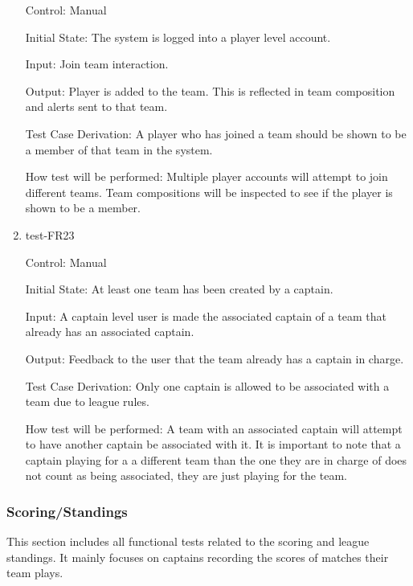 \documentclass[12pt, titlepage]{article}
\begin{document}
\begin{enumerate}
  Control: Manual

  Initial State: The system is logged into a player level account.
            
  Input: Join team interaction.
            
  Output: Player is added to the team. This is reflected in team composition
  and alerts sent to that team.

  Test Case Derivation: A player who has joined a team should be shown to be a
  member of that team in the system.

  How test will be performed: Multiple player accounts will attempt to join 
  different teams. Team compositions will be inspected to see if the player
  is shown to be a member. 

  \item{test-FR23\\}

  Control: Manual
            
  Initial State: At least one team has been created by a captain.

  Input: A captain level user is made the associated captain of a team that
  already has an associated captain.

  Output: Feedback to the user that the team already has a captain in charge.

  Test Case Derivation: Only one captain is allowed to be associated with a
  team due to league rules.

  How test will be performed: A team with an associated captain will attempt
  to have another captain be associated with it. It is important to note that
  a captain playing for a a different team than the one they are in charge of
  does not count as being associated, they are just playing for the team.

\end{enumerate}

\subsubsection{Scoring/Standings}

This section includes all functional tests related to the scoring and
league standings. It mainly focuses on captains recording the scores of
matches their team plays.
\end{document}
